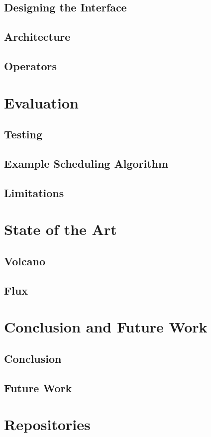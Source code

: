 \section{Designing the Interface}

\section{Architecture}

\section{Operators}


\chapter{Evaluation}
\section{Testing}

\section{Example Scheduling Algorithm} \label{sec:exampleSchedulingAlgorithm}

\section{Limitations}


\chapter{State of the Art}
\section{Volcano}

\section{Flux}


\chapter{Conclusion and Future Work}
\section{Conclusion}

\section{Future Work}




\appendix
\chapter{Repositories}




